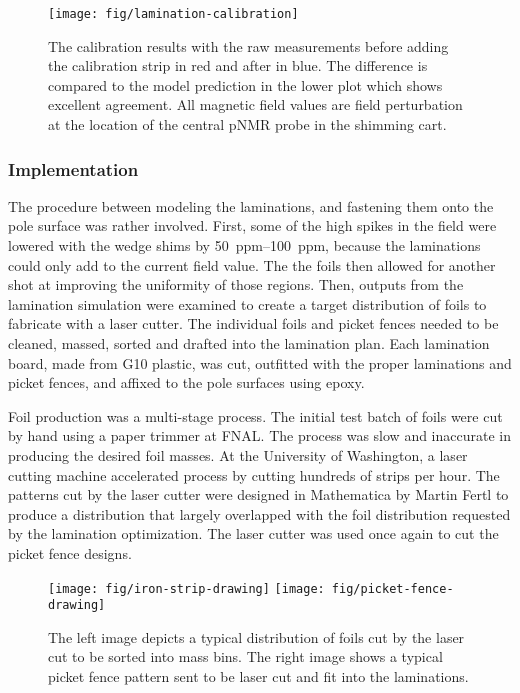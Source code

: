 \begin{figure}
\centering
\texttt{[image: fig/lamination-calibration]}
\caption{
    The calibration results with the raw measurements before adding the calibration strip in red and after in blue.  The difference is compared to the model prediction in the lower plot which shows excellent agreement.  All magnetic field values are field perturbation at the location of the central pNMR probe in the shimming cart. 
    \label{fig:lamination-calibration}
}
\end{figure}

\subsubsection{Implementation}

The procedure between modeling the laminations, and fastening them onto the pole surface was rather involved.  First, some of the high spikes in the field were lowered with the wedge shims by \SIrange{50}{100}{ppm}, because the laminations could only add to the current field value.  The the foils then allowed for another shot at improving the uniformity of those regions.  Then, outputs from the lamination simulation were examined to create a target distribution of foils to fabricate with a laser cutter.  The individual foils and picket fences needed to be cleaned, massed, sorted and drafted into the lamination plan.  Each lamination board, made from G10 plastic, was cut, outfitted with the proper laminations and picket fences, and affixed to the pole surfaces using epoxy.

Foil production was a multi-stage process.  The initial test batch of foils were cut by hand using a paper trimmer at FNAL.  The process was slow and inaccurate in producing the desired foil masses.  At the University of Washington, a laser cutting machine accelerated process by cutting hundreds of strips per hour.  The patterns cut by the laser cutter were designed in Mathematica by Martin Fertl to produce a distribution that largely overlapped with the foil distribution requested by the lamination optimization.  The laser cutter was used once again to cut the picket fence designs.

\begin{figure}
\centering
\texttt{[image: fig/iron-strip-drawing]}
\texttt{[image: fig/picket-fence-drawing]}
\caption{
    The left image depicts a typical distribution of foils cut by the laser cut to be sorted into mass bins.  The right image shows a typical picket fence pattern sent to be laser cut and fit into the laminations. 
    \label{fig:laser-cutter-drawings}
}
\end{figure}

